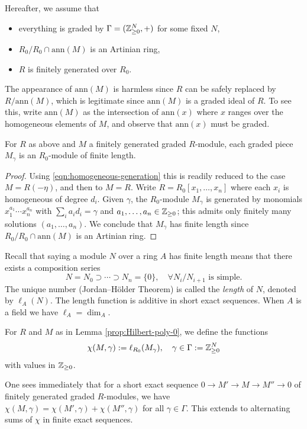 Hereafter, we assume that
\begin{itemize}
	\item everything is graded by $\Gamma = (\mathbb{Z}_{\geq 0}^N, +)$ for some fixed $N$,
	\item $R_0/R_0 \cap \text{ann}(M)$ is an Artinian ring,
	\item $R$ is finitely generated over $R_0$.
\end{itemize}
The appearance of $\text{ann}(M)$ is harmless since $R$ can be safely replaced by $R/\text{ann}(M)$, which is legitimate since $\text{ann}(M)$ is a graded ideal of $R$. To see this, write $\text{ann}(M)$ as the intersection of $\text{ann}(x)$ where $x$ ranges over the homogeneous elements of $M$, and observe that $\text{ann}(x)$ must be graded.

\begin{lemma}\label{prop:Hilbert-poly-0}
	For $R$ as above and $M$ a finitely generated graded $R$-module, each graded piece $M_\gamma$ is an $R_0$-module of finite length.
\end{lemma}
\begin{proof}
	Using \eqref{eqn:homogeneous-generation} this is readily reduced to the case $M = R(-\eta)$, and then to $M=R$. Write $R = R_0[x_1, \ldots, x_n]$ where each $x_i$ is homogeneous of degree $d_i$. Given $\gamma$, the $R_0$-module $M_\gamma$ is generated by monomials $x_1^{a_1} \cdots x_n^{a_n}$ with $\sum_i a_i d_i = \gamma$ and $a_1, \ldots, a_n \in \mathbb{Z}_{\geq 0}$; this admits only finitely many solutions $(a_1, \ldots, a_n)$. We conclude that $M_\gamma$ has finite length since $R_0/R_0 \cap \text{ann}(M)$ is an Artinian ring.
\end{proof}

Recall that saying a module $N$ over a ring $A$ has finite length means that there exists a composition series
\[ N = N_0 \supset \cdots \supset N_n = \{0\}, \quad \forall N_i/N_{i+1} \text{ is simple.} \]
The unique number (Jordan--Hölder Theorem) is called the \emph{length} of $N$, denoted by $\ell_A(N)$. The length function is additive in short exact sequences. When $A$ is a field we have $\ell_A = \dim_A$. 

\begin{definition}
	For $R$ and $M$ as in Lemma \ref{prop:Hilbert-poly-0}, we define the functions
	\[ \chi(M, \gamma) := \ell_{R_0}(M_\gamma), \quad \gamma \in \Gamma := \mathbb{Z}_{\geq 0}^N \]
	with values in $\mathbb{Z}_{\geq 0}$.
\end{definition}
One sees immediately that for a short exact sequence $0 \to M' \to M \to M'' \to 0$ of finitely generated graded $R$-modules, we have $\chi(M,\gamma) = \chi(M',\gamma) + \chi(M'',\gamma)$ for all $\gamma \in \Gamma$. This extends to alternating sums of $\chi$ in finite exact sequences.

